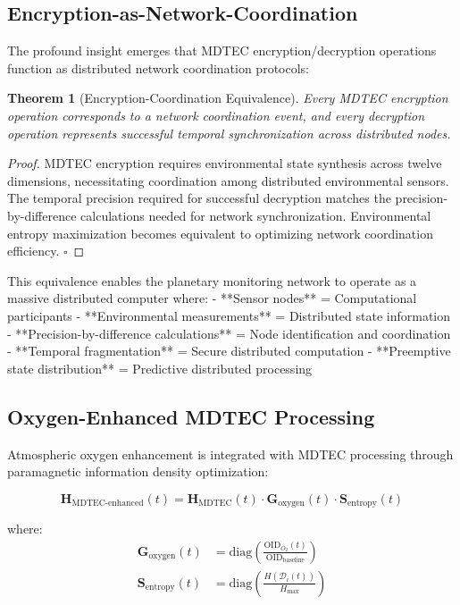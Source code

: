 \documentclass[12pt,a4paper]{article}
\newtheorem{theorem}{Theorem}
\begin{document}
\subsection{Encryption-as-Network-Coordination}

The profound insight emerges that MDTEC encryption/decryption operations function as distributed network coordination protocols:

\begin{theorem}[Encryption-Coordination Equivalence]
Every MDTEC encryption operation corresponds to a network coordination event, and every decryption operation represents successful temporal synchronization across distributed nodes.
\end{theorem}

\begin{proof}
MDTEC encryption requires environmental state synthesis across twelve dimensions, necessitating coordination among distributed environmental sensors. The temporal precision required for successful decryption matches the precision-by-difference calculations needed for network synchronization. Environmental entropy maximization becomes equivalent to optimizing network coordination efficiency. $\square$
\end{proof}

This equivalence enables the planetary monitoring network to operate as a massive distributed computer where:
- **Sensor nodes** = Computational participants
- **Environmental measurements** = Distributed state information  
- **Precision-by-difference calculations** = Node identification and coordination
- **Temporal fragmentation** = Secure distributed computation
- **Preemptive state distribution** = Predictive distributed processing

\subsection{Oxygen-Enhanced MDTEC Processing}

Atmospheric oxygen enhancement is integrated with MDTEC processing through paramagnetic information density optimization:

\begin{equation}
\mathbf{H}_{\text{MDTEC-enhanced}}(t) = \mathbf{H}_{\text{MDTEC}}(t) \cdot \mathbf{G}_{\text{oxygen}}(t) \cdot \mathbf{S}_{\text{entropy}}(t)
\end{equation}

where:
\begin{align}
\mathbf{G}_{\text{oxygen}}(t) &= \text{diag}\left(\frac{\text{OID}_{O_2}(t)}{\text{OID}_{\text{baseline}}}\right) \\
\mathbf{S}_{\text{entropy}}(t) &= \text{diag}\left(\frac{H(\mathcal{D}_i(t))}{H_{\text{max}}}\right)
\end{align}
\end{document}
